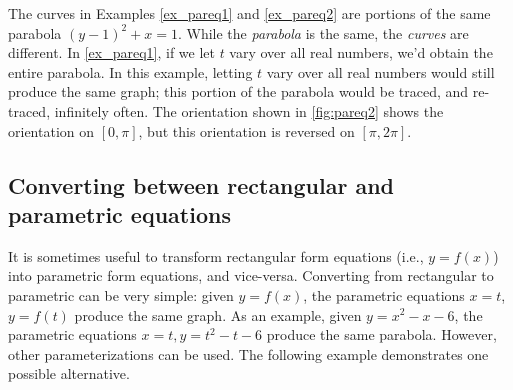 \begin{example}
The curves in Examples \ref{ex_pareq1} and \ref{ex_pareq2} are portions of the same parabola $(y-1)^2+x=1$. While the \emph{parabola} is the same, the \emph{curves} are different. In \autoref{ex_pareq1}, if we let $t$ vary over all real numbers, we'd obtain the entire parabola. In this example, letting $t$ vary over all real numbers would still produce the same graph; this portion of the parabola would be traced, and re-traced, infinitely often. The orientation shown in \autoref{fig:pareq2} shows the orientation on $[0,\pi]$, but this orientation is reversed on $[\pi,2\pi]$.
\end{example}

\subsection{Converting between rectangular and parametric equations}

It is sometimes useful to transform rectangular form equations (i.e., $y=f(x)$) into parametric form equations, and vice-versa. Converting from rectangular to parametric can be very simple: given $y=f(x)$, the parametric equations $x=t$, $y=f(t)$ produce the same graph. As an example, given $y=x^2-x-6$, the parametric equations $x=t, y=t^2-t-6$ produce the same parabola. However, other parameterizations can be used. The following example demonstrates one possible alternative.

